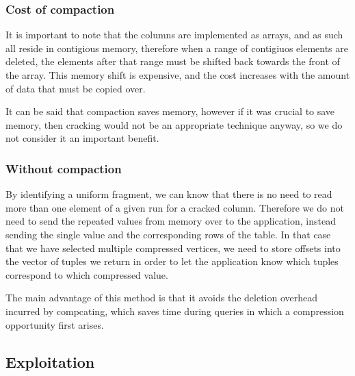 \subsubsection{Cost of compaction}

It is important to note that the columns are implemented as arrays, and as such all reside in
contigious memory, therefore when a range of contigiuos elements are deleted, the elements after
that range must be shifted back towards the front of the array. This memory shift is expensive,
and the cost increases with the amount of data that must be copied over.

It can be said that compaction saves memory, however if it was crucial to save memory, then cracking
would not be an appropriate technique anyway, so we do not consider it an important benefit.

\subsubsection{Without compaction}

By identifying a uniform fragment, we can know that there is no need to read more than one element
of a given run for a cracked column. Therefore we do not need to send the repeated values from
memory over to the application, instead sending the single value and the corresponding rows of the
table. In that case that we have selected multiple compressed vertices, we need to store offsets
into the vector of tuples we return in order to let the application know which tuples correspond to
which compressed value.

The main advantage of this method is that it avoids the deletion overhead incurred by compcating,
which saves time during queries in which a compression opportunity first arises.

\subsection{Exploitation}

\label{ss:compressionexploitation}
